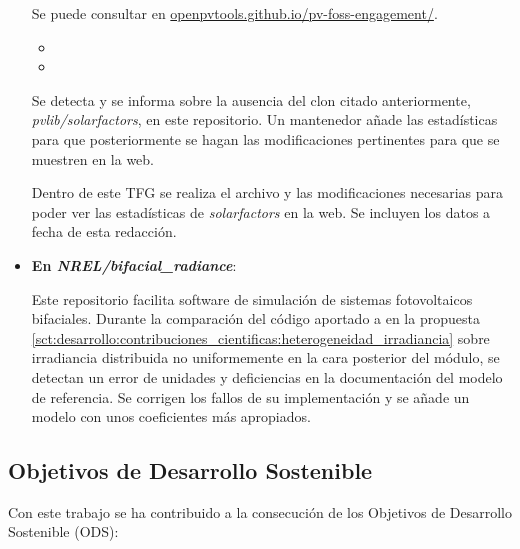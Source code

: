 \begin{itemize}
          Se puede consultar en \href{https://openpvtools.github.io/pv-foss-engagement/}{openpvtools.github.io/pv-foss-engagement/}.

          \begin{itemize}
              \item {}
              \item {}
          \end{itemize}

          Se detecta y se informa sobre la ausencia del clon citado anteriormente, \textit{pvlib/solarfactors}, en este \gls{repositorio}. Un mantenedor añade las estadísticas para que posteriormente se hagan las modificaciones pertinentes para que se muestren en la web.

          Dentro de este TFG se realiza el archivo y las modificaciones necesarias para poder ver las estadísticas de \textit{solarfactors} en la web. Se incluyen los datos a fecha de esta redacción.

    \item \textbf{En \textit{NREL/bifacial\_radiance}}:

          Este \gls{repositorio} facilita \gls{software} de simulación de sistemas fotovoltaicos bifaciales. Durante la comparación del código aportado a \pvlibpy{} en la propuesta \ref{sct:desarrollo:contribuciones_cientificas:heterogeneidad_irradiancia} sobre irradiancia distribuida no uniformemente en la cara posterior del \gls{módulo}, se detectan un error de unidades y deficiencias en la documentación del modelo de referencia. Se corrigen los fallos de su implementación y se añade un modelo con unos coeficientes más apropiados.

\end{itemize}


\subsection{Objetivos de Desarrollo Sostenible} \label{sssct:impacto:ods}

Con este trabajo se ha contribuido a la consecución de los Objetivos de Desarrollo Sostenible (ODS):

